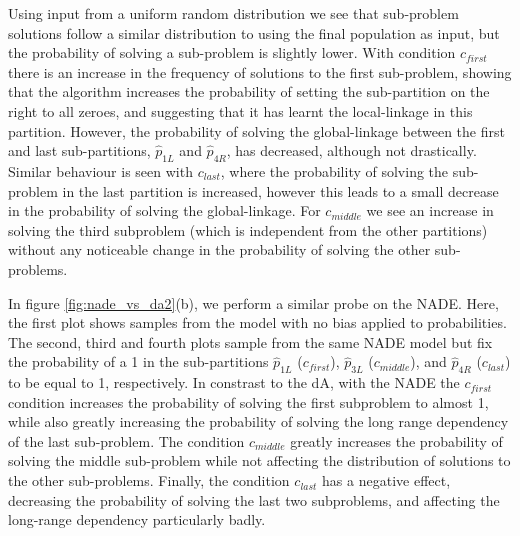 \documentclass[twoside]{article}
\begin{document}
Using input from a uniform random distribution we see that sub-problem solutions follow a similar distribution to using the final population as input, but the probability of solving a sub-problem is slightly lower. With condition \(c_{first}\) there is an increase in the frequency of solutions to the first sub-problem, showing that the algorithm increases the probability of setting the sub-partition on the right to all zeroes, and suggesting that it has learnt the local-linkage in this partition. However, the probability of solving the global-linkage between the first and last sub-partitions, \(\hat{p}_{1L}\) and \(\hat{p}_{4R}\), has decreased, although not drastically. Similar behaviour is seen with \(c_{last}\), where the probability of solving the sub-problem in the last partition is increased, however this leads to a small decrease in the probability of solving the global-linkage. For \(c_{middle}\) we see an increase in solving the third subproblem (which is independent from the other partitions) without any noticeable change in the probability of solving the other sub-problems.

In figure \ref{fig:nade_vs_da2}(b), we perform a similar probe on the NADE. Here, the first plot shows samples from the model with no bias applied to probabilities. The second, third and fourth plots sample from the same NADE model but fix the probability of a 1 in the sub-partitions \(\hat{p}_{1L}\) (\(c_{first}\)), \(\hat{p}_{3L}\) (\(c_{middle}\)), and \(\hat{p}_{4R}\) (\(c_{last}\)) to be equal to 1, respectively. In constrast to the dA, with the NADE the \(c_{first}\) condition increases the probability of solving the first subproblem to almost 1, while also greatly increasing the probability of solving the long range dependency of the last sub-problem. The condition \(c_{middle}\) greatly increases the probability of solving the middle sub-problem while not affecting the distribution of solutions to the other sub-problems. Finally, the condition \(c_{last}\) has a negative effect, decreasing the probability of solving the last two subproblems, and affecting the long-range dependency particularly badly.
\end{document}

